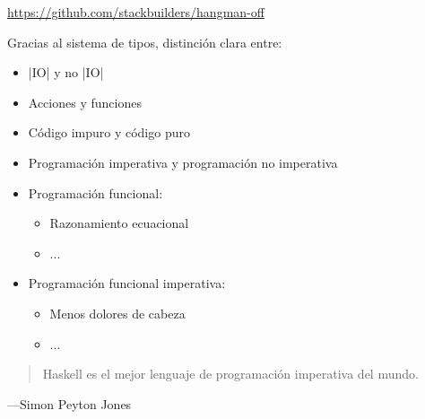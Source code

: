 \documentclass[spanish]{beamer}
\begin{document}

\begin{frame}
  \begin{center}
    \url{https://github.com/stackbuilders/hangman-off}
  \end{center}
\end{frame}


\begin{frame}[fragile]
  Gracias al sistema de tipos, distinción clara entre:
  \begin{itemize}
  \item |IO| y no |IO|
  \item Acciones y funciones
  \item Código impuro y código puro
  \item Programación imperativa y programación no imperativa
  \end{itemize}
\end{frame}


\begin{frame}
  \begin{itemize}
  \item Programación funcional:
    \begin{itemize}
    \item Razonamiento ecuacional
    \item ...
    \end{itemize}
  \item Programación funcional imperativa:
    \begin{itemize}
    \item Menos dolores de cabeza
    \item ...
    \end{itemize}
  \end{itemize}
\end{frame}


\begin{frame}
  \begin{quote}
    Haskell es el mejor lenguaje de programación imperativa del mundo.
  \end{quote}
  \hfill---Simon Peyton Jones
\end{frame}
\end{document}
